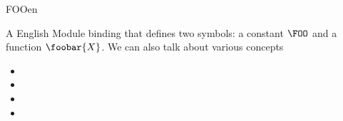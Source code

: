 \begin{mhmodnl}{FOO}{en}
  \begin{definition}
    A English Module binding that defines two symbols: a constant $\FOO$ and a function
    $\foobar{X}$. We can also talk about various concepts
    \begin{itemize}
    \item   {}
    \item   {}
    \item   {}
    \item   {}
    \end{itemize}
  \end{definition}
\end{mhmodnl}

